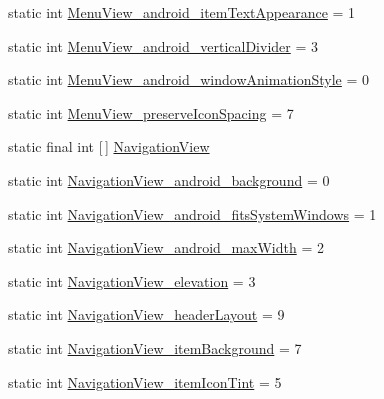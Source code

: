 \begin{DoxyCompactItemize}
\item 
static int \hyperlink{classandroid_1_1support_1_1v7_1_1appcompat_1_1R_1_1styleable_a6a5f97c5e220a37019516cf6bff0ccb8}{Menu\+View\+\_\+android\+\_\+item\+Text\+Appearance} = 1
\item 
static int \hyperlink{classandroid_1_1support_1_1v7_1_1appcompat_1_1R_1_1styleable_aaa05173a2f852ccfca3b7df5fefadbdd}{Menu\+View\+\_\+android\+\_\+vertical\+Divider} = 3
\item 
static int \hyperlink{classandroid_1_1support_1_1v7_1_1appcompat_1_1R_1_1styleable_abfc971adc049e070d2cbed01ebde0129}{Menu\+View\+\_\+android\+\_\+window\+Animation\+Style} = 0
\item 
static int \hyperlink{classandroid_1_1support_1_1v7_1_1appcompat_1_1R_1_1styleable_a8b0fb09a515b636405db851879e9fb7d}{Menu\+View\+\_\+preserve\+Icon\+Spacing} = 7
\item 
static final int \mbox{[}$\,$\mbox{]} \hyperlink{classandroid_1_1support_1_1v7_1_1appcompat_1_1R_1_1styleable_a52cfb3ba7bdfc8fb2cca459f35c24456}{Navigation\+View}
\item 
static int \hyperlink{classandroid_1_1support_1_1v7_1_1appcompat_1_1R_1_1styleable_ad2f7cafaca85dee660d34efdbbba270b}{Navigation\+View\+\_\+android\+\_\+background} = 0
\item 
static int \hyperlink{classandroid_1_1support_1_1v7_1_1appcompat_1_1R_1_1styleable_aec5d356c8231527e8f7c1febb5eb9892}{Navigation\+View\+\_\+android\+\_\+fits\+System\+Windows} = 1
\item 
static int \hyperlink{classandroid_1_1support_1_1v7_1_1appcompat_1_1R_1_1styleable_a7ee62bbed79d58ceb628d59bef150cec}{Navigation\+View\+\_\+android\+\_\+max\+Width} = 2
\item 
static int \hyperlink{classandroid_1_1support_1_1v7_1_1appcompat_1_1R_1_1styleable_a9b37fb60ab34a99e03f8fd95245baa0c}{Navigation\+View\+\_\+elevation} = 3
\item 
static int \hyperlink{classandroid_1_1support_1_1v7_1_1appcompat_1_1R_1_1styleable_a25d0749f6f4b3021640c947c8f4790fd}{Navigation\+View\+\_\+header\+Layout} = 9
\item 
static int \hyperlink{classandroid_1_1support_1_1v7_1_1appcompat_1_1R_1_1styleable_a245c0ec3356c0065fcc832a44ad5c26b}{Navigation\+View\+\_\+item\+Background} = 7
\item 
static int \hyperlink{classandroid_1_1support_1_1v7_1_1appcompat_1_1R_1_1styleable_a045753abfbdae682420f420a25f71659}{Navigation\+View\+\_\+item\+Icon\+Tint} = 5
\item 

\end{DoxyCompactItemize}
